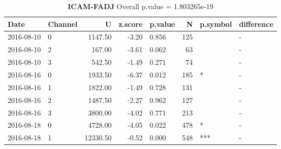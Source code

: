 \begin{table}[ht]
\caption[ICAM-FADJ]{\textbf{ICAM-FADJ} Overall p.value = 1.803265e-19}
\centering
\begin{tabular}{llrrlrll}
  \hline
Date & Channel & U & z.score & p.value & N & p.symbol & difference \\ 
  \hline
2016-08-10 & 0 & 1147.50 & -3.20 & 0.856 & 125 &  & - \\ 
  2016-08-10 & 2 & 167.00 & -3.61 & 0.062 &  63 &  & - \\ 
  2016-08-10 & 3 & 542.50 & -1.49 & 0.271 &  74 &  & - \\ 
  2016-08-16 & 0 & 1933.50 & -6.37 & 0.012 & 185 & * & - \\ 
  2016-08-16 & 1 & 1822.00 & -1.49 & 0.728 & 131 &  & - \\ 
  2016-08-16 & 2 & 1487.50 & -2.27 & 0.962 & 127 &  & - \\ 
  2016-08-16 & 3 & 3800.00 & -4.02 & 0.771 & 213 &  & - \\ 
  2016-08-18 & 0 & 4728.00 & -4.05 & 0.022 & 478 & * & - \\ 
  2016-08-18 & 1 & 12330.50 & -0.52 & 0.000 & 548 & *** & - \\ 
   \hline
\end{tabular}
\end{table}
